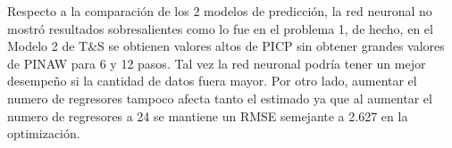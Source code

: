\documentclass[12pt]{article}
\begin{document}
Respecto a la comparación de los 2 modelos de predicción, la red neuronal no mostró resultados sobresalientes como lo fue en el problema 1, de hecho, en el Modelo 2 de T\&S se obtienen valores altos de PICP sin obtener grandes valores de PINAW para 6 y 12 pasos. Tal vez la red neuronal podría tener un mejor desempeño si la cantidad de datos fuera mayor. Por otro lado, aumentar el numero de regresores tampoco afecta tanto el estimado ya que al aumentar el numero de regresores a 24 se mantiene un RMSE semejante a 2.627 en la optimización.

\newpage


\end{document}
